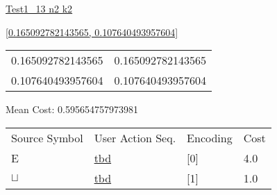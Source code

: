 \documentclass[12pt]{article}
\begin{document}
\noindent \url{Test1_13 n2 k2}

\noindent \url{[0.165092782143565, 0.107640493957604]}

\noindent\begin{tt}
\begin{small}
\begin{bundle}{}
\end{bundle}
\end{small}
\end{tt}
\newpage%
\begin{tabular}{l l}0.165092782143565	&	0.165092782143565\\
0.107640493957604	&	0.107640493957604\\
\end{tabular}\newpage
\noindent
\noindent Mean Cost: 0.595654757973981\\
\begin{tabular}{l l l l}
Source Symbol	&	User Action Seq.	&	Encoding	&	Cost\\
E	&	\url{tbd}	&	[0]	&	4.0\\
$\sqcup$	&	\url{tbd}	&	[1]	&	1.0\\
\end{tabular}
\end{document}
